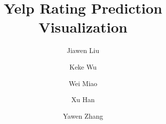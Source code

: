 \documentclass[sigconf]{acmart}
\theoremstyle{definition}
\begin{document}
\title{Yelp Rating Prediction Visualization}

\author{Jiawen Liu}
%
\author{Keke Wu}
%
\author{Wei Miao}
%
\author{Xu Han}
%
\author{Yawen Zhang}


 


\maketitle









 
\end{document}
